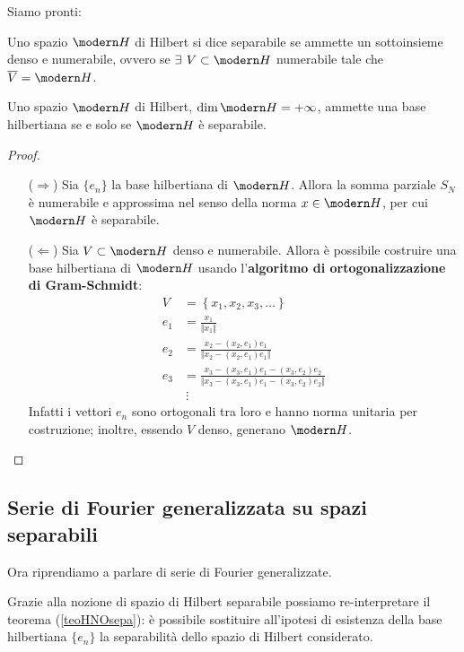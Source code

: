 Siamo pronti:

\begin{defn}
Uno spazio $\Hc$ di Hilbert si dice separabile se ammette un sottoinsieme denso e numerabile, ovvero se $\exists\,V\subset \Hc$ numerabile tale che $\overline{V}=\Hc$.
\end{defn}

\begin{thm}
Uno spazio $\Hc$ di Hilbert, $\dim \Hc=+\infty$, ammette una base hilbertiana se e solo se $\Hc$ è separabile.
\end{thm}

\begin{proof}\leavevmode
\begin{enumerate}
    \item [($\Rightarrow$)] Sia $\{e_n\}$ la base hilbertiana di $\Hc$. Allora la somma parziale $S_N$ è numerabile e approssima nel senso della norma $x\in \Hc$, per cui $\Hc$ è separabile.
    \item [($\Leftarrow$)] Sia $V\subset \Hc$ denso e numerabile. Allora è possibile costruire una base hilbertiana di $\Hc$ usando l'\textbf{algoritmo di ortogonalizzazione di Gram-Schmidt}:
    \begin{align*}
    V&=\left\{x_1,x_2,x_3,\dots \right\} \\
    e_1&=\frac{x_1}{\Vert x_1 \Vert} \\
    e_2&=\frac{x_2-(x_2,e_1)e_1}{\Vert x_2-(x_2,e_1)e_1 \Vert} \\
    e_3&=\frac{x_3-(x_3,e_1)e_1-(x_3,e_2)e_2}{\Vert x_3-(x_3,e_1)e_1-(x_3,e_2)e_2 \Vert} \\
    &\ \vdots
    \end{align*}
    Infatti i vettori $e_n$ sono ortogonali tra loro e hanno norma unitaria per costruzione; inoltre, essendo $V$ denso, generano $\Hc$.
\end{enumerate}
\end{proof}


\subsection{Serie di Fourier generalizzata su spazi separabili} %
\label{sub:serie_di_fourier_generalizzata_su_spazi_separabili}

Ora riprendiamo a parlare di serie di Fourier generalizzate.

Grazie alla nozione di spazio di Hilbert separabile possiamo re-interpretare il teorema (\ref{teoHNOsepa}): è possibile sostituire all'ipotesi di esistenza della base hilbertiana $\{e_n\}$ la separabilità dello spazio di Hilbert considerato.

